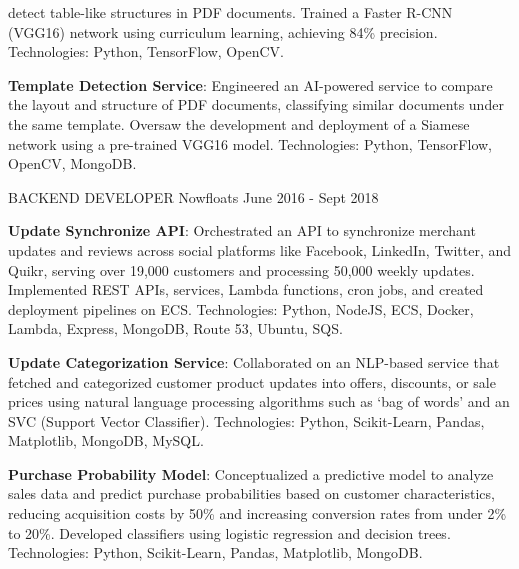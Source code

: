 \begin{cventries}
{\begin{cvitems}
{        detect table-like structures in PDF documents. \newline Trained a Faster 
        R-CNN (VGG16) network using curriculum learning, 
        achieving 84\% precision. \newline Technologies: Python, TensorFlow, OpenCV.}      
        \item{\textbf{Template Detection Service}: Engineered an AI-powered service to compare the 
        layout and structure of PDF documents, classifying similar documents under 
        the same template. \newline Oversaw the development and deployment of a Siamese network using a pre-trained 
        VGG16 model. \newline Technologies: Python, TensorFlow, OpenCV, MongoDB.}       
	\end{cvitems}
    }
\vspace{2em} %
  \cventry
    {BACKEND DEVELOPER} %
    {Nowfloats} %
    {} %
    {June 2016 - Sept 2018} %
    {
      \begin{cvitems} %
        \item{\textbf{Update Synchronize API}: Orchestrated an API to synchronize merchant updates and reviews across social platforms like Facebook, LinkedIn, Twitter, and Quikr, serving over 19,000 customers and processing 50,000 weekly updates. \newline Implemented REST APIs, services, Lambda functions, cron jobs, and created deployment pipelines on ECS. \newline Technologies: Python, NodeJS, ECS, Docker, Lambda, Express, MongoDB, Route 53, Ubuntu, SQS.}
        \item{\textbf{Update Categorization Service}: Collaborated on an NLP-based service that fetched and categorized customer product updates into offers, discounts, or sale prices using natural language processing algorithms such as ‘bag of words’ and an SVC (Support Vector Classifier). \newline Technologies: Python, Scikit-Learn, Pandas, Matplotlib, MongoDB, MySQL.}
        \item{\textbf{Purchase Probability Model}: Conceptualized a predictive model to analyze sales data and predict purchase probabilities based on customer characteristics, reducing acquisition costs by 50\% and increasing conversion rates from under 2\% to 20\%. \newline Developed classifiers using logistic regression and decision trees. \newline Technologies: Python, Scikit-Learn, Pandas, Matplotlib, MongoDB.}
      \end{cvitems}
    }

\end{cventries}